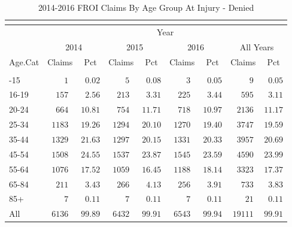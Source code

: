 \documentclass[9pt, oneside]{article}   	%
\begin{document}
\begin{longtable}{lcccccccc}
\caption{2014-2016 FROI Claims By Age Group At Injury - Denied}\\
\label{Table: Five.Denied}\\
 \hline
                  \toprule
 & \multicolumn{8}{c}{Year} \\ 
 & \multicolumn{2}{c}{2014} & \multicolumn{2}{c}{2015} & \multicolumn{2}{c}{2016} & \multicolumn{2}{c}{All Years} \\ 
Age.Cat  & Claims & Pct & Claims & Pct & Claims & Pct & Claims & \multicolumn{1}{c}{Pct} \\ 
\midrule\\ [-1\normalbaselineskip]\hline\endhead\hline\endfoot
14-15  & $\phantom{000}1$ & $\phantom{0}0.02$ & $\phantom{000}5$ & $\phantom{0}0.08$ & $\phantom{000}3$ & $\phantom{0}0.05$ & $\phantom{0000}9$ & $\phantom{0}0.05$ \\
16-19  & $\phantom{0}157$ & $\phantom{0}2.56$ & $\phantom{0}213$ & $\phantom{0}3.31$ & $\phantom{0}225$ & $\phantom{0}3.44$ & $\phantom{00}595$ & $\phantom{0}3.11$ \\
20-24  & $\phantom{0}664$ & $10.81$ & $\phantom{0}754$ & $11.71$ & $\phantom{0}718$ & $10.97$ & $\phantom{0}2136$ & $11.17$ \\
25-34  & $1183$ & $19.26$ & $1294$ & $20.10$ & $1270$ & $19.40$ & $\phantom{0}3747$ & $19.59$ \\
35-44  & $1329$ & $21.63$ & $1297$ & $20.15$ & $1331$ & $20.33$ & $\phantom{0}3957$ & $20.69$ \\
45-54  & $1508$ & $24.55$ & $1537$ & $23.87$ & $1545$ & $23.59$ & $\phantom{0}4590$ & $23.99$ \\
55-64  & $1076$ & $17.52$ & $1059$ & $16.45$ & $1188$ & $18.14$ & $\phantom{0}3323$ & $17.37$ \\
65-84  & $\phantom{0}211$ & $\phantom{0}3.43$ & $\phantom{0}266$ & $\phantom{0}4.13$ & $\phantom{0}256$ & $\phantom{0}3.91$ & $\phantom{00}733$ & $\phantom{0}3.83$ \\
85+  & $\phantom{000}7$ & $\phantom{0}0.11$ & $\phantom{000}7$ & $\phantom{0}0.11$ & $\phantom{000}7$ & $\phantom{0}0.11$ & $\phantom{000}21$ & $\phantom{0}0.11$ \\
\cline{1-1} \cline{2-2} \cline{3-3} \cline{4-4} \cline{5-5} \cline{6-6} \cline{7-7}  \cline{8-8} \cline{9-9}%
All  & $6136$ & $99.89$ & $6432$ & $99.91$ & $6543$ & $99.94$ & $19111$ & $99.91$ \\
\hline 
\end{longtable}
\end{document}
